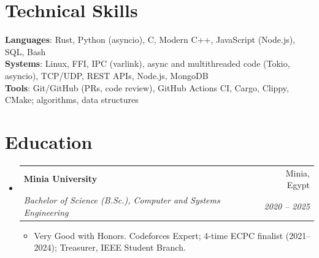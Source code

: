 \documentclass[letterpaper,11pt]{article}
\makeatletter
\newcommand{\resumeItem}[1]{
  \item\small{
    {#1 \vspace{-2pt}}
  }
}
\newcommand{\resumeSubheading}[4]{
  \vspace{-2pt}\item
    \begin{tabular*}{0.97\textwidth}[t]{l@{\extracolsep{\fill}}r}
      \textbf{#1} & #2 \\
      \textit{\small#3} & \textit{\small #4} \\
    \end{tabular*}\vspace{-7pt}
}
\newcommand{\resumeSubHeadingListStart}{\begin{itemize}[leftmargin=0.15in, label={}]}
\newcommand{\resumeSubHeadingListEnd}{\end{itemize}}
\newcommand{\resumeItemListStart}{\begin{itemize}}
\newcommand{\resumeItemListEnd}{\end{itemize}\vspace{-5pt}}
\makeatother
\begin{document}
%
\section{Technical Skills}
 \begin{itemize}[leftmargin=0.15in, label={}]
    \small{\item{
     \textbf{Languages}{: Rust, Python (asyncio), C, Modern C++, JavaScript (Node.js), SQL, Bash} \\
     \textbf{Systems}{: Linux, FFI, IPC (varlink), async and multithreaded code (Tokio, asyncio), TCP/UDP, REST APIs, Node.js, MongoDB} \\
     \textbf{Tools}{: Git/GitHub (PRs, code review), GitHub Actions CI, Cargo, Clippy, CMake; algorithms, data structures}
    }}
 \end{itemize}

\section{Education}
  \resumeSubHeadingListStart
    \resumeSubheading
      {Minia University}{Minia, Egypt}
      {Bachelor of Science (B.Sc.), Computer and Systems Engineering}{2020 -- 2025}
      \resumeItemListStart
        \resumeItem{Very Good with Honors. Codeforces Expert; 4-time ECPC finalist (2021--2024); Treasurer, IEEE Student Branch.}
      \resumeItemListEnd
  \resumeSubHeadingListEnd


\end{document}
